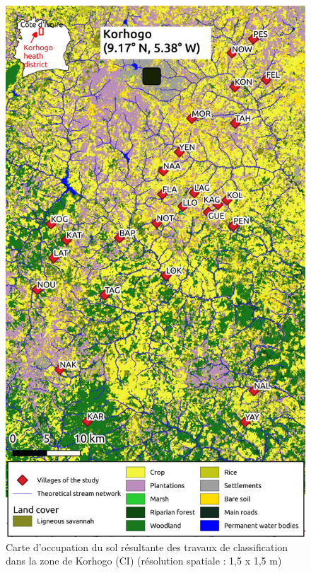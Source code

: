 \documentclass[12pt,twoside]{reedthesis}
\begin{document}
\begin{figure}

{\centering \includegraphics[width=0.8\linewidth]{figure/map_landcover_ci} 

}

\caption[Carte d'occupation du sol résultante des travaux de classification dans la zone de Korhogo (CI)]{Carte d'occupation du sol résultante des travaux de classification dans la zone de Korhogo (CI) (résolution spatiale : 1,5 x 1,5 m)}\label{fig:map-landcover-ci}
\end{figure}
\pagebreak
\end{document}
